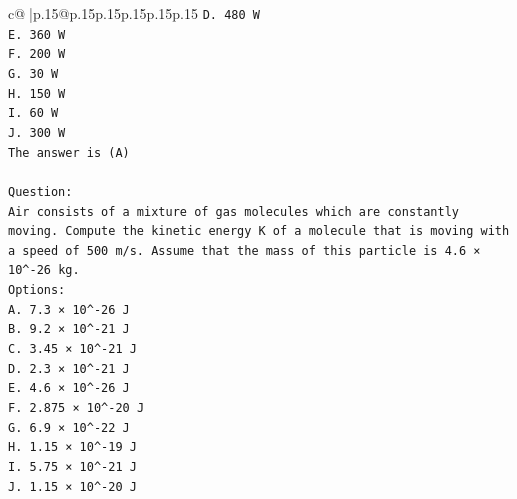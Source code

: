\documentclass{article}
\begin{document}
{\begin{supertabular}{c@{$\;$}|p{.15\linewidth}@{}p{.15\linewidth}p{.15\linewidth}p{.15\linewidth}p{.15\linewidth}p{.15\linewidth}}
{{{\texttt{D. 480 W} \\
\texttt{E. 360 W} \\
\texttt{F. 200 W} \\
\texttt{G. 30 W} \\
\texttt{H. 150 W} \\
\texttt{I. 60 W} \\
\texttt{J. 300 W} \\
\texttt{The answer is (A)} \\
\\ 
\texttt{Question:} \\
\texttt{Air consists of a mixture of gas molecules which are constantly moving. Compute the kinetic energy K of a molecule that is moving with a speed of 500 m/s. Assume that the mass of this particle is 4.6 × 10\^{}{-}26 kg.} \\
\texttt{Options:} \\
\texttt{A. 7.3 × 10\^{}{-}26 J} \\
\texttt{B. 9.2 × 10\^{}{-}21 J} \\
\texttt{C. 3.45 × 10\^{}{-}21 J} \\
\texttt{D. 2.3 × 10\^{}{-}21 J} \\
\texttt{E. 4.6 × 10\^{}{-}26 J} \\
\texttt{F. 2.875 × 10\^{}{-}20 J} \\
\texttt{G. 6.9 × 10\^{}{-}22 J} \\
\texttt{H. 1.15 × 10\^{}{-}19 J} \\
\texttt{I. 5.75 × 10\^{}{-}21 J} \\
\texttt{J. 1.15 × 10\^{}{-}20 J} \\
            }
        }
    }
     \\ \\


\end{supertabular}}
\end{document}
